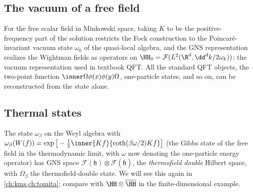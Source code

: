 \subsection{The vacuum of a free field}
For the free scalar field in Minkowski space, taking $K$ to be the positive-frequency part of the solution restricts the Fock construction to the Poincar\'e-invariant vacuum state $\omega_0$ of the quasi-local algebra, and the GNS representation realizes the Wightman fields as operators on $\HH_0=\mathcal F(L^2(\R^d,\dd^dk/2\omega_k))$: the vacuum representation used in textbook QFT. All the standard QFT objects, the two-point function $\inner\Omega{\phi(x)\phi(y)\Omega}$, one-particle states, and so on, can be reconstructed from the state alone.

\subsection{Thermal states}
The state $\omega_\beta$ on the Weyl algebra with $\omega_\beta(W(f))=\exp\big[-\tfrac12\inner{Kf}{\coth(\beta\omega/2)Kf}\big]$ (the Gibbs state of the free field in the thermodynamic limit, with $\omega$ now denoting the one-particle energy operator) has GNS space $\mathcal F(\mathfrak h)\otimes\mathcal F(\overline{\mathfrak h})$, the \emph{thermofield double} Hilbert space, with $\Omega_\beta$ the thermofield-double state. We will see this again in \cref{ch:kms,ch:tomita}; compare with $\HH\otimes\overline\HH$ in the finite-dimensional example.

